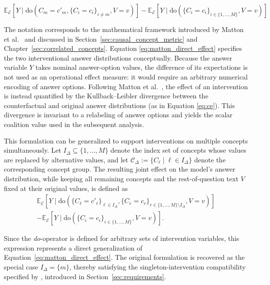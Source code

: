 \begin{equation}
	\label{eq:matton_direct_effect}
	\mathbb{E}_{\mathcal{E}}[Y \mid \text{do}(C_m = c'_m, \{C_i = c_i\}_{i \neq m}, V = v)] -
	\mathbb{E}_{\mathcal{E}}[Y \mid \text{do}(\{C_i = c_i\}_{i \in \{1,\dots,M\}}, V = v)]
\end{equation}

The notation corresponds to the mathematical framework introduced by Matton et al.~\cite{mattonWalkTalkMeasuring2024} and discussed in Section~\ref{sec:causal_concept_metric} and Chapter~\ref{sec:correlated_concepts}. Equation \ref{eq:matton_direct_effect} specifies the two interventional answer distributions conceptually. Because the answer variable $Y$ takes nominal answer-option values, the difference of its expectations is not used as an operational effect measure: it would require an arbitrary numerical encoding of answer options. Following Matton et al.~\cite{mattonWalkTalkMeasuring2024}, the effect of an intervention is instead quantified by the Kullback–Leibler divergence between the counterfactual and original answer distributions (as in Equation \ref{eq:ce}). This divergence is invariant to a relabeling of answer options and yields the scalar coalition value used in the subsequent analysis.

This formulation can be generalized to support interventions on multiple concepts simultaneously. Let $I_{\Delta} \subseteq \{1,\dots,M\}$ denote the index set of concepts whose values are replaced by alternative values, and let $\mathcal{C}_{\Delta}:=\{C_\ell \mid \ell \in I_{\Delta}\}$ denote the corresponding concept group. The resulting joint effect on the model's answer distribution, while keeping all remaining concepts and the rest-of-question text $V$ fixed at their original values, is defined as
\begin{multline}
	\label{eq:matton_multi_direct_effect}
	\mathbb{E}_{\mathcal{E}}[Y \mid
		\text{do}(\{C_\ell = c'_\ell\}_{\ell \in I_{\Delta}},
		\{C_r = c_r\}_{r \in \{1,\dots,M\}\setminus I_{\Delta}},
		V = v)]
	\\
	-
	\mathbb{E}_{\mathcal{E}}[Y \mid
		\text{do}(\{C_i = c_i\}_{i \in \{1,\dots,M\}},
		V = v)].
\end{multline}

Since the \emph{do}-operator is defined for arbitrary sets of intervention variables, this expression represents a direct generalization of Equation~\ref{eq:matton_direct_effect}. The original formulation is recovered as the special case $I_{\Delta}=\{m\}$, thereby satisfying the singleton-intervention compatibility specified by , introduced in Section~\ref{sec:requirements}.


